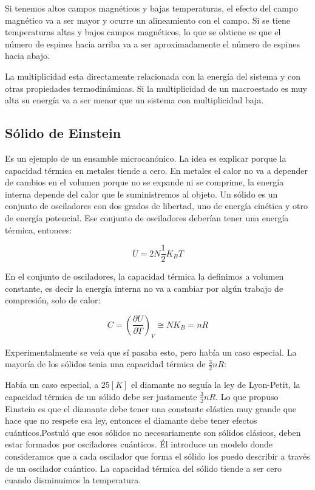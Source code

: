 \documentclass[11pt,fleqn]{book}
\begin{document}
\begin{example}

Si tenemos altos campos magnéticos y bajas temperaturas, el efecto del campo magnético va a ser mayor y ocurre un alineamiento con el campo. Si se tiene temperaturas altas y bajos campos magnéticos, lo que se obtiene es que el número de espines hacia arriba va a ser aproximadamente el número de espines hacia abajo.

\end{example}

La multiplicidad esta directamente relacionada con la energía del sistema y con otras propiedades termodinámicas. Si la multiplicidad de un macroestado es muy alta su energía va a ser menor que un sistema con multiplicidad baja.


\subsection{Sólido de Einstein}

Es un ejemplo de un ensamble microcanónico.  La idea es explicar porque la capacidad térmica en metales tiende a cero. En metales el calor no va a depender de cambios en el volumen porque no se expande ni se comprime, la energía interna depende del calor que le suministremos al objeto. Un sólido es un conjunto de osciladores con dos grados de libertad, uno de energía cinética y otro de energía potencial. Ese conjunto de osciladores deberían tener una energía térmica, entonces:


\begin{equation}
    U=2N\frac{1}{2}K_{B}T
    \label{Eq. 2.4}
\end{equation}

En el conjunto de osciladores, la capacidad térmica la definimos a volumen constante, es decir la energía interna no va a cambiar por algún trabajo de compresión, solo de calor:

\begin{equation*}
    C=\left(\frac{\partial U}{\partial T}\right)_{V}\cong NK_{B}=nR
\end{equation*}

Experimentalmente se veía que sí pasaba esto, pero había un caso especial. La mayoría de los sólidos tenia una capacidad térmica de $\frac{3}{2}nR$:




Había un caso especial, a $25 [K]$ el diamante no seguía la ley de Lyon-Petit, la capacidad térmica de un sólido debe ser justamente $\frac{3}{2}nR$. Lo que propuso Einstein es que el diamante debe tener una constante elástica muy grande que hace que no respete esa ley, entonces el diamante debe tener efectos cuánticos.Postuló que esos sólidos no necesariamente son sólidos clásicos, deben estar formados por osciladores cuánticos. Él introduce un modelo donde consideramos que a cada oscilador que forma el sólido los puedo describir a través de un oscilador cuántico. La capacidad térmica del sólido tiende a ser cero cuando disminuimos la temperatura.
\end{document}
